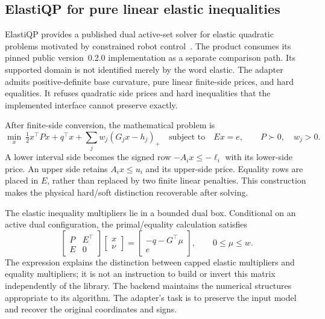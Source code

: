 \subsection{ElastiQP for pure linear elastic inequalities}\label{sec:elasti}
ElastiQP provides a published dual active-set solver for elastic quadratic
problems motivated by constrained robot control~\cite{elasti}. The product
consumes its pinned public version~0.2.0 implementation as a separate comparison path.
Its supported domain is not identified merely by the word elastic. The adapter
admits positive-definite base curvature, pure linear finite-side prices, and
hard equalities. It refuses quadratic side prices and hard inequalities that
the implemented interface cannot preserve exactly.

After finite-side conversion, the mathematical problem is
\begin{equation}\label{eq:elasti-model}
 \min_x\ \tfrac12x^\top P x+q^\top x+
             \sum_j w_j(G_jx-h_j)_+
 \quad\text{subject to}\quad Ex=e,\qquad P\succ0,\quad w_j>0.
\end{equation}
A lower interval side becomes the signed row $-A_i x\leq-\ell_i$ with its
lower-side price. An upper side retains $A_i x\leq u_i$ and its upper-side
price. Equality rows are placed in $E$, rather than replaced by two finite
linear penalties. This construction makes the physical hard/soft distinction
recoverable after solving.

The elastic inequality multipliers lie in a bounded dual box. Conditional on
an active dual configuration, the primal/equality calculation satisfies
\begin{equation}\label{eq:elasti-kkt}
 \begin{bmatrix}P&E^\top\\E&0\end{bmatrix}
 \begin{bmatrix}x\\\nu\end{bmatrix}
 =\begin{bmatrix}-q-G^\top\mu\\e\end{bmatrix},
 \qquad 0\leq\mu\leq w.
\end{equation}
The expression explains the distinction between capped elastic multipliers
and equality multipliers; it is not an instruction to build or invert this
matrix independently of the library. The backend maintains the numerical
structures appropriate to its algorithm. The adapter's task is to preserve the
input model and recover the original coordinates and signs.

